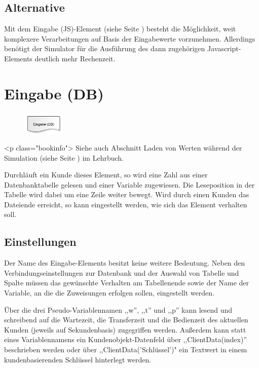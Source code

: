 \subsection*{Alternative}

Mit dem Eingabe (JS)-Element (siehe Seite \pageref{ref:ModelElementInputJS}) besteht die Möglichkeit, weit komplexere
Verarbeitungen auf Basis der Eingabewerte vorzunehmen. Allerdings benötigt der Simulator für die Ausführung
des dann zugehörigen Javascript-Elements deutlich mehr Rechenzeit.


\section{Eingabe (DB)}
\label{ref:ModelElementInputDB}

\begin{figure}
\vspace{-22pt}
\includegraphics[width=2cm]{imageModelElementInputDB.png}
\vspace{-22pt}
\end{figure}

<p class="bookinfo">
Siehe auch Abschnitt Laden von Werten während der Simulation (siehe Seite \pageref{ref:book:9.3.2}) im Lehrbuch.

Durchläuft ein Kunde dieses Element, so wird eine Zahl aus einer Datenbanktabelle gelesen und einer
Variable zugewiesen. Die Leseposition in der Tabelle wird dabei um eine Zeile weiter bewegt.
Wird durch einen Kunden das Dateiende erreicht, so kann eingestellt werden, wie sich
das Element verhalten soll.

\subsection*{Einstellungen}

Der Name des Eingabe-Elements besitzt keine weitere Bedeutung. Neben den Verbindungseinstellungen
zur Datenbank und der Auswahl von Tabelle und Spalte müssen das gewünschte Verhalten am Tabellenende
sowie der Name der Variable, an die die Zuweisungen erfolgen sollen, eingestellt werden.

Über die drei Pseudo-Variablennamen ,,w'', ,,t'' und ,,p'' kann lesend und schreibend auf die Wartezeit, die Transferzeit
und die Bedienzeit des aktuellen Kunden (jeweils auf Sekundenbasis) zugegriffen werden. Außerdem kann statt eines
Variablennamens ein Kundenobjekt-Datenfeld über ,,ClientData(index)'' beschrieben werden oder über ,,ClientData('Schlüssel')"
ein Textwert in einem kundenbasierenden Schlüssel hinterlegt werden.


